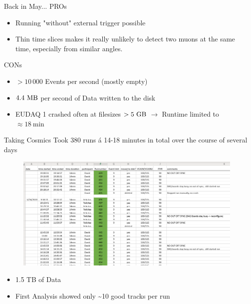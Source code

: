 \documentclass{beamer}
\begin{document}
\begin{frame}{Back in May...}
    \Large PROs \footnotesize \\
    \begin{itemize}
	\item Running "without" external trigger possible
	\item Thin time slices makes it really unlikely to detect
	    two muons at the same time, especially from similar angles.
    \end{itemize}
    \Large CONs \footnotesize 
    \begin{itemize}
	\item $> 10 \, 000$ Events per second (mostly empty)
	\item $4.4 \ \si{\mega \byte}$ per second of Data written to the disk
	\item EUDAQ 1 crashed often at filesizes \( > 5 \ \si{\giga \byte} \)
	    $\rightarrow$ Runtime limited to \( \approx 18 \ \si{\minute} \) 
    \end{itemize}
\end{frame}

\begin{frame}{Taking Cosmics}
    Took 380 runs á 14-18 minutes in total over the course of several days
    \begin{figure}[H]
	\centering
	\includegraphics[width=.9\textwidth]{Screenshot.png}
    \end{figure}
    \footnotesize
    \begin{minipage}{.33\textwidth}
	\begin{itemize}
	    \item 1.5 TB of Data
	\end{itemize}
    \end{minipage}
    \begin{minipage}{.65\textwidth}
	\begin{itemize}
	    \item First Analysis showed only \textasciitilde 10 good tracks per
		run
	\end{itemize}
    \end{minipage}
\end{frame}
\end{document}
